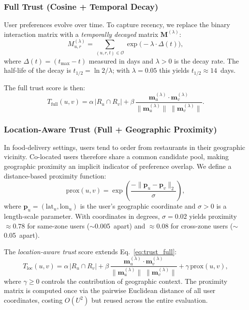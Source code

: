 \documentclass[conference]{IEEEtran}
\begin{document}
\subsubsection{Full Trust (Cosine + Temporal Decay)}
\label{sec:temporal}
User preferences evolve over time.  To capture recency, we replace the
binary interaction matrix with a \emph{temporally decayed} matrix
$\mathbf{M}^{(\lambda)}$:
\begin{equation}
  M^{(\lambda)}_{u,r} = \sum_{(u,r,t) \in \mathcal{O}}
    \exp\!\bigl(-\lambda \cdot \Delta(t)\bigr),
  \label{eq:decay_matrix}
\end{equation}
where $\Delta(t) = (t_{\max} - t)$ measured in days and $\lambda > 0$ is
the decay rate.  The half-life of the decay is
$t_{1/2} = \ln 2 / \lambda$; with $\lambda = 0.05$ this yields
$t_{1/2} \approx 14$~days.

The full trust score is then:
\begin{equation}
  T_{\text{full}}(u, v) = \alpha \, |R_u \cap R_v| + \beta \,
    \frac{\mathbf{m}^{(\lambda)}_u \cdot \mathbf{m}^{(\lambda)}_v}
         {\|\mathbf{m}^{(\lambda)}_u\| \; \|\mathbf{m}^{(\lambda)}_v\|}.
  \label{eq:trust_full}
\end{equation}

\subsubsection{Location-Aware Trust (Full + Geographic Proximity)}
\label{sec:location}
In food-delivery settings, users tend to order from restaurants in their
geographic vicinity.  Co-located users therefore share a common candidate
pool, making geographic proximity an implicit indicator of preference
overlap.  We define a distance-based proximity function:
\begin{equation}
  \text{prox}(u, v) = \exp\!\left(\frac{-\|\mathbf{p}_u - \mathbf{p}_v\|_2}
    {\sigma}\right),
  \label{eq:proximity}
\end{equation}
where $\mathbf{p}_u = (\text{lat}_u, \text{lon}_u)$ is the user's
geographic coordinate and $\sigma > 0$ is a length-scale parameter.
With coordinates in degrees, $\sigma = 0.02$ yields proximity
$\approx 0.78$ for same-zone users ($\sim$0.005\textdegree\ apart) and
$\approx 0.08$ for cross-zone users ($\sim$0.05\textdegree\ apart).

The \emph{location-aware trust} score extends Eq.~\ref{eq:trust_full}:
\begin{equation}
  T_{\text{loc}}(u, v) = \alpha \, |R_u \cap R_v| + \beta \,
    \frac{\mathbf{m}^{(\lambda)}_u \cdot \mathbf{m}^{(\lambda)}_v}
         {\|\mathbf{m}^{(\lambda)}_u\| \; \|\mathbf{m}^{(\lambda)}_v\|}
    + \gamma \, \text{prox}(u, v),
  \label{eq:trust_location}
\end{equation}
where $\gamma \geq 0$ controls the contribution of geographic context.
The proximity matrix is computed once via the pairwise Euclidean distance
of all user coordinates, costing $O(U^2)$ but reused across the entire
evaluation.
\end{document}
